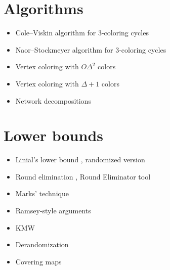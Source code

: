 \documentclass[a4paper,11pt]{article}
\begin{document}
\section{Algorithms}
\begin{itemize}
    \item Cole--Viskin algorithm for 3-coloring cycles \cite{cole-vishkin-1986-deterministic-coin-tossing-with,goldberg-plotkin-shannon-1988-parallel-symmetry}
    \item Naor--Stockmeyer algorithm for 3-coloring cycles \cite{naor-stockmeyer-1995-what-can-be-computed-locally}
    \item Vertex coloring with $O\Delta^2$ colors \cite{linial-1992-locality-in-distributed-graph-algorithms}
    \item Vertex coloring with $\Delta+1$ colors \cite{maus-tonoyan-2022-linial-for-lists,barenboim-elkin-goldenberg-2022-locally-iterative}
    \item Network decompositions \cite{awerbuch-goldberg-etal-1989-network-decomposition-and,rozhon-ghaffari-2020-polylogarithmic-time-deterministic}
\end{itemize}

\section{Lower bounds}
\begin{itemize}
    \item Linial's lower bound \cite{linial-1992-locality-in-distributed-graph-algorithms}, randomized version \cite{naor-1991-a-lower-bound-on-probabilistic-algorithms-for}
    \item Round elimination \cite{brandt-2019-an-automatic-speedup-theorem-for,brandt-fischer-etal-2016-a-lower-bound-for-the}, Round Eliminator tool \cite{olivetti-2020-brief-announcement-round-eliminator-a,olivetti-2025-round-eliminator-a-tool-for-automatic}
    \item Marks' technique \cite{marks-2016-a-determinacy-approach-to-borel,brandt-chang-etal-2022-local-problems-on-trees-from-the}
    \item Ramsey-style arguments \cite{naor-stockmeyer-1995-what-can-be-computed-locally,czygrinow-hanckowiak-wawrzyniak-2008-fast-distributed}
    \item KMW \cite{kuhn-moscibroda-wattenhofer-2004-what-cannot-be,kuhn-moscibroda-wattenhofer-2006-the-price-of-being,kuhn-moscibroda-wattenhofer-2016-local-computation,coupette-lenzen-2021-a-breezing-proof-of-the-kmw-bound}
    \item Derandomization \cite{naor-stockmeyer-1995-what-can-be-computed-locally,chang-kopelowitz-pettie-2019-an-exponential-separation,dahal-d-amore-etal-2023-brief-announcement-distributed}
    \item Covering maps \cite{angluin-1980-local-and-global-properties-in-networks-of,yamashita-kameda-1996-computing-on-anonymous-networks}
\end{itemize}
\end{document}
